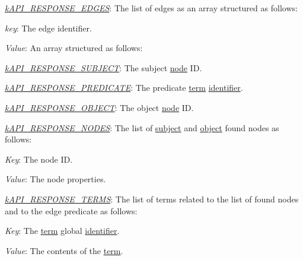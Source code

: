 \begin{DoxyItemize}
\item {\itshape \hyperlink{}{k\-A\-P\-I\-\_\-\-R\-E\-S\-P\-O\-N\-S\-E\-\_\-\-E\-D\-G\-E\-S}}\-: The list of edges as an array structured as follows\-: 
\begin{DoxyItemize}
\item {\itshape key}\-: The edge identifier. 
\item {\itshape Value}\-: An array structured as follows\-: 
\begin{DoxyItemize}
\item {\itshape \hyperlink{}{k\-A\-P\-I\-\_\-\-R\-E\-S\-P\-O\-N\-S\-E\-\_\-\-S\-U\-B\-J\-E\-C\-T}}\-: The subject \hyperlink{class_c_ontology_node}{node} I\-D. 
\item {\itshape \hyperlink{}{k\-A\-P\-I\-\_\-\-R\-E\-S\-P\-O\-N\-S\-E\-\_\-\-P\-R\-E\-D\-I\-C\-A\-T\-E}}\-: The predicate \hyperlink{class_c_ontology_term}{term} \hyperlink{}{identifier}. 
\item {\itshape \hyperlink{}{k\-A\-P\-I\-\_\-\-R\-E\-S\-P\-O\-N\-S\-E\-\_\-\-O\-B\-J\-E\-C\-T}}\-: The object \hyperlink{class_c_ontology_node}{node} I\-D. 
\end{DoxyItemize}
\end{DoxyItemize}
\item {\itshape \hyperlink{}{k\-A\-P\-I\-\_\-\-R\-E\-S\-P\-O\-N\-S\-E\-\_\-\-N\-O\-D\-E\-S}}\-: The list of \hyperlink{}{subject} and \hyperlink{}{object} found nodes as follows\-: 
\begin{DoxyItemize}
\item {\itshape Key}\-: The node I\-D. 
\item {\itshape Value}\-: The node properties. 
\end{DoxyItemize}
\item {\itshape \hyperlink{}{k\-A\-P\-I\-\_\-\-R\-E\-S\-P\-O\-N\-S\-E\-\_\-\-T\-E\-R\-M\-S}}\-: The list of terms related to the list of found nodes and to the edge predicate as follows\-: 
\begin{DoxyItemize}
\item {\itshape Key}\-: The \hyperlink{class_c_ontology_term}{term} global \hyperlink{}{identifier}. 
\item {\itshape Value}\-: The contents of the \hyperlink{class_c_ontology_term}{term}. 
\end{DoxyItemize}
\end{DoxyItemize}

